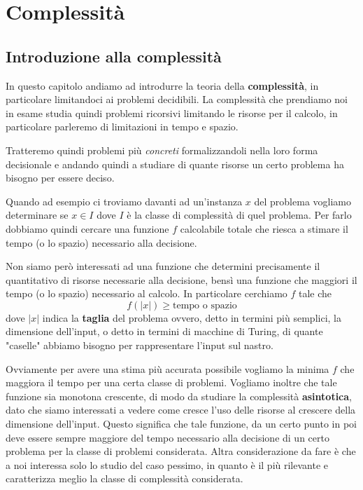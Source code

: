 \part{Complessità}

\chapter{Introduzione alla complessità}

In questo capitolo andiamo ad introdurre la teoria della
\textbf{complessità}, in particolare limitandoci ai problemi
decidibili. La complessità che prendiamo noi in esame studia
quindi problemi ricorsivi limitando le risorse per il calcolo,
in particolare parleremo di limitazioni in tempo e spazio.

Tratteremo quindi problemi più \emph{concreti} formalizzandoli
nella loro forma decisionale e andando quindi a studiare di
quante risorse un certo problema ha bisogno per essere deciso.

Quando ad esempio ci troviamo davanti ad un'instanza $x$ del
problema vogliamo determinare se $x \in I$ dove $I$ è la classe
di complessità di quel problema. Per farlo dobbiamo quindi
cercare una funzione $f$ calcolabile totale che riesca a stimare
il tempo (o lo spazio) necessario alla decisione.

Non siamo però interessati ad una funzione che determini
precisamente il quantitativo di risorse necessarie alla
decisione, bensì una funzione che maggiori il tempo (o lo spazio)
necessario al calcolo. In particolare cerchiamo $f$ tale che
\[ f(|x|) \geq \text{tempo o spazio} \]
dove $|x|$ indica la \textbf{taglia} del problema ovvero, detto
in termini più semplici, la dimensione dell'input, o detto in
termini di macchine di Turing, di quante "caselle" abbiamo
bisogno per rappresentare l'input sul nastro.

Ovviamente per avere una stima più accurata possibile vogliamo
la minima $f$ che maggiora il tempo per una certa classe di
problemi. Vogliamo inoltre che tale funzione sia monotona
crescente, di modo da studiare la complessità
\textbf{asintotica}, dato che siamo interessati a vedere come
cresce l'uso delle risorse al crescere della dimensione
dell'input. Questo significa che tale funzione, da un certo
punto in poi deve essere sempre maggiore del tempo necessario
alla decisione di un certo problema per la classe di problemi
considerata. Altra considerazione da fare è che a noi interessa
solo lo studio del caso pessimo, in quanto è il più rilevante e
caratterizza meglio la classe di complessità considerata.

